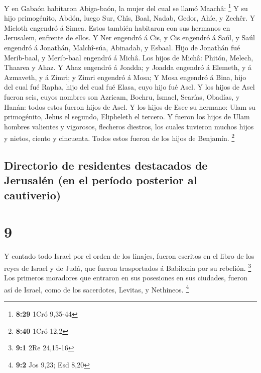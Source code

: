  Y en Gabaón habitaron Abiga-baón, la mujer del cual se
llamó Maachâ: \footnote{\textbf{8:29} 1Cró 9,35-44}  Y su
hijo primogénito, Abdón, luego Sur, Chîs, Baal, Nadab, 
Gedor, Ahíe, y Zechêr.  Y Micloth engendró á Simea. Estos
también habitaron con sus hermanos en Jerusalem, enfrente de ellos.
 Y Ner engendró á Cis, y Cis engendró á Saúl, y Saúl
engendró á Jonathán, Malchî-súa, Abinadab, y Esbaal.  Hijo
de Jonathán fué Merib-baal, y Merib-baal engendró á Michâ. 
Los hijos de Michâ: Phitón, Melech, Thaarea y Ahaz.  Y Ahaz
engendró á Joadda; y Joadda engendró á Elemeth, y á Azmaveth, y á Zimri;
y Zimri engendró á Mosa;  Y Mosa engendró á Bina, hijo del
cual fué Rapha, hijo del cual fué Elasa, cuyo hijo fué Asel.
 Y los hijos de Asel fueron seis, cuyos nombres son
Azricam, Bochru, Ismael, Searías, Obadías, y Hanán: todos estos fueron
hijos de Asel.  Y los hijos de Esec su hermano: Ulam su
primogénito, Jehus el segundo, Elipheleth el tercero.  Y
fueron los hijos de Ulam hombres valientes y vigorosos, flecheros
diestros, los cuales tuvieron muchos hijos y nietos, ciento y cincuenta.
Todos estos fueron de los hijos de Benjamín. \footnote{\textbf{8:40}
  1Cró 12,2}

\hypertarget{directorio-de-residentes-destacados-de-jerusaluxe9n-en-el-peruxedodo-posterior-al-cautiverio}{%
\subsection{Directorio de residentes destacados de Jerusalén (en el
período posterior al
cautiverio)}\label{directorio-de-residentes-destacados-de-jerusaluxe9n-en-el-peruxedodo-posterior-al-cautiverio}}

\hypertarget{section-8}{%
\section{9}\label{section-8}}

 Y contado todo Israel por el orden de los linajes, fueron
escritos en el libro de los reyes de Israel y de Judá, que fueron
trasportados á Babilonia por su rebelión. \footnote{\textbf{9:1} 2Re
  24,15-16}  Los primeros moradores que entraron en sus
posesiones en sus ciudades, fueron así de Israel, como de los
sacerdotes, Levitas, y Nethineos. \footnote{\textbf{9:2} Jos 9,23; Esd
  8,20}

